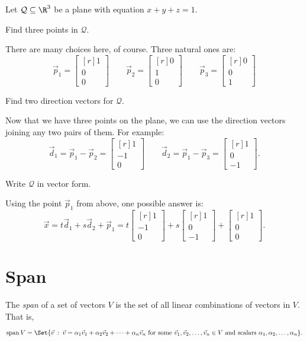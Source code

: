 \documentclass{problemset}
\DeclareMathOperator{\Span}{span}
\newcommand{\mat}[1]{\begin{bmatrix*}[r]#1\end{bmatrix*}}
\providecommand\given{}
\newcommand\SetSymbol[1][]{%
	\nonscript\::%
	\allowbreak
	\nonscript\:
	\mathopen{}}
\renewcommand\given{\SetSymbol[\delimsize]}
\begin{document}
	\question
	Let $\mathcal Q\subseteq \R^3$ be a plane with equation $x+y+z=1$.
	\begin{parts}
		\item Find three points in $\mathcal Q$.
			\begin{solution}
				There are many choices here, of course. Three natural ones are:
				\[
					\vec p_1 = \mat{1\\0\\0}
					\qquad
					\vec p_2 = \mat{0\\1\\0}
					\qquad
					\vec p_3 = \mat{0\\0\\1}
				\]
			\end{solution}
		\item Find two direction vectors for $\mathcal Q$.
			\begin{solution}
				Now that we have three points on the plane, we can use the 
				direction vectors joining any two pairs of them. For example:
				\[
					\vec d_1 = \vec p_1 - \vec p_2 = \mat{1\\-1\\0}
					\qquad
					\vec d_2 = \vec p_1 - \vec p_3 = \mat{1\\0\\-1}.
				\]
			\end{solution}
		\item Write $\mathcal Q$ in vector form.
			\begin{solution}
				Using the point $\vec p_1$ from above, one possible answer is:
				\[
					\vec x = t\vec d_1 + s\vec d_2 + \vec p_1
					= t \mat{1\\-1\\0} + s \mat{1\\0\\-1} + \mat{1\\0\\0}.
				\]
			\end{solution}
	\end{parts}

\section*{Span}
	\begin{definition}[Span]
		The \emph{span} of a set of vectors $V$ is the set of
		all linear combinations of vectors in $V$.  That is,
		\[
			\Span V = \Set{\vec v \given \vec v=\alpha_1\vec v_1+\alpha_2\vec v_2 + \cdots 
			+\alpha_n\vec v_n\text{ for some }\vec v_1,\vec v_2,\ldots,\vec v_n\in V
			\text{ and scalars }\alpha_1,\alpha_2,\ldots,\alpha_n}.
		\]
	\end{definition}
\end{document}
